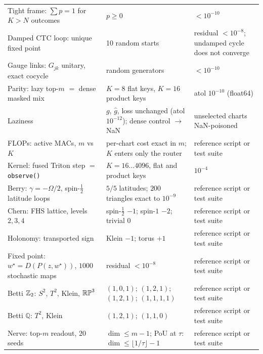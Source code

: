 \begin{table}[t]
\begin{tabular}{@{}p{3.9cm}p{5.4cm}p{6.1cm}@{}}
Tight frame: $\sum p=1$ for $K>N$ outcomes & $p\ge 0$ & $<10^{-10}$ \\
Damped CTC loop: unique fixed point & 10 random starts & residual $<10^{-8}$; undamped cycle does not converge \\
Gauge links: $G_{jk}$ unitary, exact cocycle & random generators & $<10^{-10}$ \\
Parity: lazy top-$m$ $=$ dense masked mix & $K=8$ flat keys, $K=16$ product keys & atol $10^{-10}$ (float64) \\
Laziness & $g$, $\hat g$, loss unchanged (atol $10^{-12}$); dense control $\to$ NaN & unselected charts NaN-poisoned \\
FLOPs: active MACs, $m$ vs $K$ & per-chart cost exact in $m$; $K$ enters only the router & reference script or test suite \\
Kernel: fused Triton step $=$ \texttt{observe()} & $K=16\ldots4096$, flat and product keys & $10^{-4}$ \\
Berry: $\gamma=-\Omega/2$, spin-$\tfrac12$ latitude loops & $5/5$ latitudes; $200$ triangles exact to $10^{-9}$ & reference script or test suite \\
Chern: FHS lattice, levels $2,3,4$ & spin-$\tfrac12$ $-1$; spin-$1$ $-2$; trivial $0$ & reference script or test suite \\
Holonomy: transported sign & Klein $-1$; torus $+1$ & reference script or test suite \\
Fixed point: $w^\star=D(P(z,w^\star))$, $1000$ stochastic maps & residual $<10^{-8}$ & reference script or test suite \\
Betti $\mathbb{Z}_2$: $S^2$, $T^2$, Klein, $\mathbb{RP}^3$ & $(1,0,1)$; $(1,2,1)$; $(1,2,1)$; $(1,1,1,1)$ & reference script or test suite \\
Betti $\mathbb Q$: $T^2$, Klein & $(1,2,1)$; $(1,1,0)$ & reference script or test suite \\
Nerve: top-$m$ readout, $20$ seeds & $\dim\le m-1$; PoU at $\tau$: $\dim\le\lfloor1/\tau\rfloor-1$ & reference script or test suite \\
\bottomrule
\end{tabular}
\end{table}
